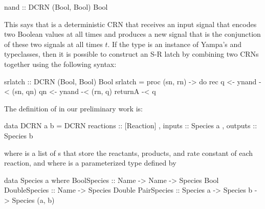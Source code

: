 \begin{haskellcode}
nand :: DCRN (Bool, Bool) Bool
\end{haskellcode}

This says that  is a deterministic CRN that receives an input signal that encodes two Boolean values at all times and produces a new signal that is the conjunction of these two signals at all times \( t \).
If the  type is an instance of Yampa's  and  typeclasses, then it is possible to construct an S-R latch by combining two  CRNs together using the following syntax:

\begin{haskellcode}
srlatch :: DCRN (Bool, Bool) Bool
srlatch = proc (sn, rn) -> do
    rec q  <- ynand -< (sn, qn)
        qn <- ynand -< (rn, q)
    returnA -< q
\end{haskellcode}

The definition of  in our preliminary work is:
\begin{haskellcode}
data DCRN a b = DCRN { reactions :: [Reaction]
                     , inputs    :: Species a
                     , outputs   :: Species b  }
\end{haskellcode}
where  is a list of s that store the reactants, products, and rate constant of each reaction, and where  is a parameterized type defined by
\begin{haskellcode}
data Species a where
    BoolSpecies   :: Name -> Name -> Species Bool
    DoubleSpecies :: Name -> Species Double
    PairSpecies   :: Species a -> Species b -> Species (a, b)
\end{haskellcode}





